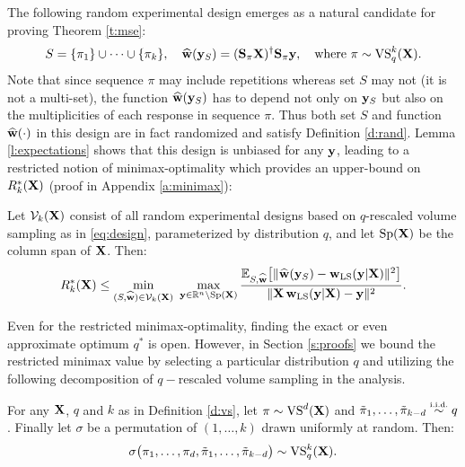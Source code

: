 \documentclass[12pt]{sty/colt2019/colt2018-arxiv}
\begin{document}
The following random experimental design emerges as a natural
candidate for proving Theorem \ref{t:mse}:
\begin{align}
  S = \{\pi_1\}\cup\dots\cup\{\pi_k\},\quad 
    \widehat{\mathbf w}(\mathbf y_S) = (\mathbf{S}_\pi\mathbf X)^ \dagger\mathbf{S}_\pi\mathbf y
    ,\quad\text{where }\pi\sim{\mathrm{VS}}_q^k(\mathbf X).\label{eq:design}
\end{align}
Note that since sequence $\pi$ may include repetitions whereas set $S$
may not (it is not a multi-set), the function 
$\widehat{\mathbf w}(\mathbf y_S)$ has to depend not only on $\mathbf y_S$ but also on the multiplicities of each
response in sequence $\pi$. Thus both set $S$ and function $\widehat{\mathbf w}(\cdot)$ 
in this design are in fact randomized and satisfy Definition \ref{d:rand}. 
%
Lemma \ref{l:expectations} shows that this design 
is unbiased for any $\mathbf y$, leading to a restricted notion of 
minimax-optimality which provides an upper-bound on $R_k^*(\mathbf X)$ (proof in
Appendix \ref{a:minimax}):
\begin{lemma}\label{l:reduction}
  Let $\mathcal{V}_k(\mathbf X)$ consist of all random experimental designs
  based on $q$-rescaled volume sampling as in \eqref{eq:design},
  parameterized by  distribution $q$, and let $\mathrm{Sp}(\mathbf X)$ be the
  column span of $\mathbf X$. Then: 
\begin{align*}
R_k^*(\X)\leq \min_{(S,\wbh)\in\Vc_k(\X)}\ 
  \max_{\y\in\R^n\backslash \mathrm{Sp}(\X)}\frac{\E_{S,\wbh}\big[\|\wbh(\y_S)-\wols(\y|\X)\|^2\big]}{\|\X\,\wols(\y|\X)-\y\|^2}.
\end{align*}
\end{lemma}
Even for the restricted minimax-optimality, finding the exact or even
approximate optimum $q^*$ is open. However,
in Section \ref{s:proofs} we bound the restricted minimax value by
selecting a particular distribution $q$ and utilizing the following
decomposition of $q-$rescaled volume sampling in the analysis. %
\begin{lemma}[\citeauthor{correcting-bias}, \citeyear{correcting-bias}]\label{l:augmenting}
For any $\mathbf X$, $q$ and $k$ as in Definition \ref{d:vs}, let
$\pi\sim{\mathrm{VS}}^d(\mathbf X)$ and $\tilde{\pi}_1,\dots,\tilde{\pi}_{k-d}\simiid
q$. Finally let $\sigma$  
be a permutation of $(1,\dots,k)$ drawn uniformly at random. Then:
\begin{align*}
  \sigma\big(\pi_1,\dots,\pi_d,\tilde{\pi}_1,\dots,\tilde{\pi}_{k-d}\big)\sim
  {\mathrm{VS}}_q^k(\mathbf X). 
\end{align*}
\end{lemma}
\end{document}
